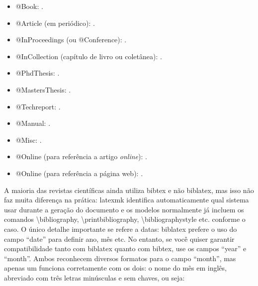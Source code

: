 \begin{multicols}{2}
  \begin{itemize}
    \item @Book: \cite{Knuth:96}.

    \item @Article (em periódico): \cite{floats2014}.

    \item @InProceedings (ou @Conference): \cite{alves03:simi}.

    \item @InCollection (capítulo de livro ou coletânea): \cite{bobaoglu93:concepts}.

    \item @PhdThesis: \cite{garcia01:PhD}.

    \item @MastersThesis: \cite{schmidt03:MSc}.

    \item @Techreport: \cite{alvisi99:analysisCIC}.

    \item @Manual: \cite{biblatex}.

    \item @Misc: \cite{gridftp}.

    \item @Online (para referência a artigo \emph{online}): \cite{fowler04:designDead}.

    \item @Online (para referência a página web): \cite{FSF:GNU-GPL}.
  \end{itemize}
\end{multicols}

A maioria das revistas científicas ainda utiliza bibtex e não
biblatex, mas isso não faz muita diferença na prática: \textsf{latexmk}
identifica automaticamente qual sistema usar durante a geração do
documento e os modelos normalmente já incluem os comandos
\textsf{\textbackslash{}bibliography},
\textsf{\textbackslash{}printbibliography},
\textsf{\textbackslash{}bibliographystyle} etc. conforme o caso.
O único detalhe importante se refere a datas:
\textsf{biblatex} prefere o uso do campo ``date'' para definir ano, mês
etc. No entanto, se você quiser garantir compatibilidade tanto com
\textsf{biblatex} quanto com \textsf{bibtex}, use os campos ``year'' e
``month''. Ambos reconhecem diversos formatos para o campo ``month'',
mas apenas um funciona corretamente com os dois: o nome do mês em inglês,
abreviado com três letras minúsculas e sem chaves, ou seja:

